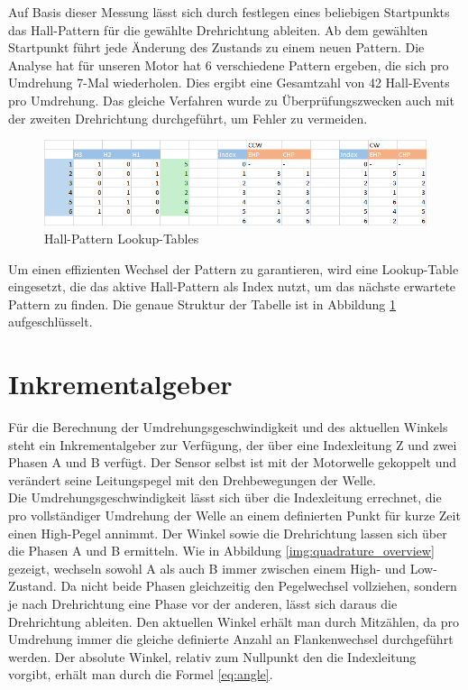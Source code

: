 Auf Basis dieser Messung lässt sich durch festlegen eines beliebigen Startpunkts das Hall-Pattern für die gewählte Drehrichtung ableiten. Ab dem gewählten Startpunkt führt jede Änderung des Zustands zu einem neuen Pattern. Die Analyse hat für unseren Motor hat 6 verschiedene Pattern ergeben, die sich pro Umdrehung 7-Mal wiederholen. Dies ergibt eine Gesamtzahl von 42 Hall-Events pro Umdrehung. Das gleiche Verfahren wurde zu Überprüfungszwecken auch mit der zweiten Drehrichtung durchgeführt, um Fehler zu vermeiden. 

\begin{figure}[h]
\centering
\includegraphics[width=\textwidth]{sensor/hall_pattern_lookup.PNG}
\caption{Hall-Pattern Lookup-Tables}
\label{img:hall_pattern_lookup}
\end{figure}

Um einen effizienten Wechsel der Pattern zu garantieren, wird eine Lookup-Table eingesetzt, die das aktive Hall-Pattern als Index nutzt, um das nächste erwartete Pattern zu finden. Die genaue Struktur der Tabelle ist in Abbildung \ref{img:hall_pattern_lookup} aufgeschlüsselt.

\section{Inkrementalgeber}
Für die Berechnung der Umdrehungsgeschwindigkeit und des aktuellen Winkels steht ein Inkrementalgeber zur Verfügung, der über eine Indexleitung Z und zwei Phasen A und B verfügt. Der Sensor selbst ist mit der Motorwelle gekoppelt und verändert seine Leitungspegel mit den Drehbewegungen der Welle. \\

Die Umdrehungsgeschwindigkeit lässt sich über die Indexleitung errechnet, die pro vollständiger Umdrehung der Welle an einem definierten Punkt für kurze Zeit einen High-Pegel annimmt. Der Winkel sowie die Drehrichtung lassen sich über die Phasen A und B ermitteln. Wie in Abbildung \ref{img:quadrature_overview} gezeigt, wechseln sowohl A als auch B immer zwischen einem High- und Low-Zustand. Da nicht beide Phasen gleichzeitig den Pegelwechsel vollziehen, sondern je nach Drehrichtung eine Phase vor der anderen, lässt sich daraus die Drehrichtung ableiten. Den aktuellen Winkel erhält man durch Mitzählen, da pro Umdrehung immer die gleiche definierte Anzahl an Flankenwechsel durchgeführt werden. Der absolute Winkel, relativ zum Nullpunkt den die Indexleitung vorgibt, erhält man durch die Formel \ref{eq:angle}.

